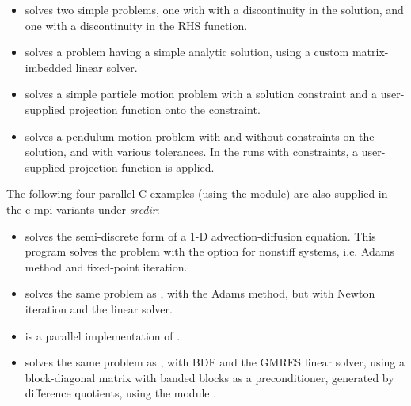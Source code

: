 \begin{itemize}
  The ODE system is solved using Newton iteration, the
  {\sunlinsolspgmr} linear solver (scaled preconditioned GMRES), and
  {\cvls} interface.
  \newline
  The preconditioner matrix used is the product of two matrices:
  (1) a matrix, only defined implicitly, based on a fixed number of
  Gauss--Seidel iterations using the diffusion terms only; and
  (2) a block-diagonal matrix based on the partial derivatives of the
  interaction terms only, using block-grouping.
  \newline
  Four different runs are made for this problem.
  The product preconditioner is applied on the left and on the right.
  In each case, both the modified and classical Gram--Schmidt options
  are tested.
\item {} solves two simple problems, one with with a
  discontinuity in the solution, and one with a discontinuity in the
  RHS function.
\item {} solves a problem having a simple analytic
  solution, using a custom matrix-imbedded linear solver.
\item {} solves a simple particle motion problem
  with a solution constraint and a user-supplied projection function
  onto the constraint.
\item {} solves a pendulum motion problem with and
  without constraints on the solution, and with various tolerances.  In the
  runs with constraints, a user-supplied projection function is applied.
\end{itemize}

\vspace{0.2in}\noindent The following four parallel C examples (using the
{\nvecp} module) are also supplied in the c-mpi variants under
{\em srcdir}:
\begin{itemize}
\item {} solves the semi-discrete form of a 1-D
  advection-diffusion equation.
  \newline
  This program solves the problem with the option for nonstiff
  systems, i.e. Adams method and fixed-point iteration.
\item {}
  solves the same problem as , with the Adams method,
  but with Newton iteration and the  linear solver.
\item {}
  is a parallel implementation of .
\item {}
  solves the same problem as , with BDF and the GMRES linear
  solver, using a block-diagonal matrix with banded blocks as a preconditioner,
  generated by difference quotients, using the module {\cvbbdpre}.
\end{itemize}

